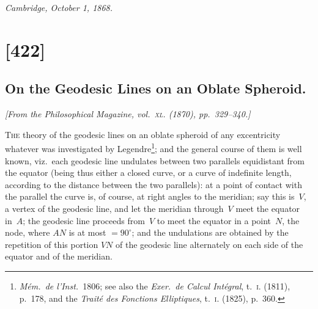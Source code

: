\documentclass[11pt,a4paper]{article}
\theoremstyle{plain}
\theoremstyle{definition}
\begin{document}
\begin{flushright}
\textit{Cambridge, October 1, 1868.}
\end{flushright}

\clearpage

\section{[422]}
\subsection{On the Geodesic Lines on an Oblate Spheroid.}

\begin{center}
\textit{[From the Philosophical Magazine, vol.~\textsc{xl}. (1870), pp.~329--340.]}
\end{center}

\textsc{The} theory of the geodesic lines on an oblate spheroid of any excentricity
whatever was investigated by Legendre\footnote{\textit{M\'{e}m.\ de l'Inst.}\ 1806; see also the
\textit{Exer.\ de Calcul Int\'{e}gral}, t.~\textsc{i}. (1811), p.~178, and the \textit{Trait\'{e} des Fonctions
Elliptiques}, t.~\textsc{i}. (1825), p.~360.}; and the general course of them is well known,
viz.\ each geodesic line undulates between two parallels equidistant from the equator
(being thus either a closed curve, or a curve of indefinite length, according to the
distance between the two parallels): at a point of contact with the parallel the curve
is, of course, at right angles to the meridian; say this is~$V$, a vertex of the geodesic
line, and let the meridian through~$V$ meet the equator in~$A$; the geodesic line proceeds
from~$V$ to meet the equator in a point~$N$, the node, where $AN$ is at most $= 90^\circ$;
and the undulations are obtained by the repetition of this portion $VN$ of the geodesic
line alternately on each side of the equator and of the meridian.
\end{document}
